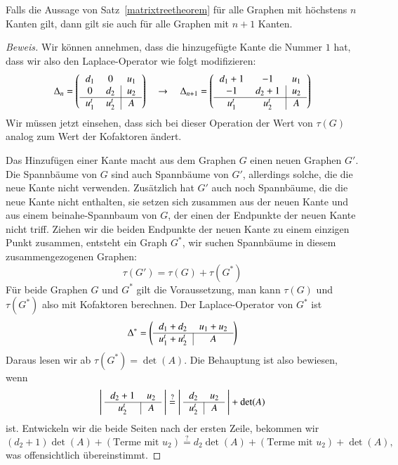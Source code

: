 \begin{hilfssatz}
\label{matrixtreetheoremstep}
Falls die Aussage von Satz~\ref{matrixtreetheorem}
für alle Graphen mit höchstens $n$ Kanten
gilt, dann gilt sie auch für alle Graphen mit $n+1$ Kanten.
\end{hilfssatz}

\begin{proof}[Beweis]
Wir können annehmen, dass die hinzugefügte Kante die Nummer $1$
hat, dass wir also den Laplace-Operator wie folgt modifizieren:
\[
\Delta_n
=
\left(\begin{tabular}{>{$}c<{$}>{$}c<{$}|>{$}c<{$}>{$}c<{$}}
d_1   &    0&u_1\\
    0 &d_2  &u_2\\
\hline
 u_1^t&u_2^t&A
\end{tabular}
\right)
\quad
\rightarrow
\quad
\Delta_{n+1}
=
\left(\begin{tabular}{>{$}c<{$}>{$}c<{$}|>{$}c<{$}>{$}c<{$}}
d_1+1 &   -1&u_1\\
   -1 &d_2+1&u_2\\
\hline
u_1^t &u_2^t&A
\end{tabular}
\right)
\]
Wir müssen jetzt einsehen, dass sich bei dieser Operation
der Wert von $\tau(G)$ analog zum Wert der Kofaktoren ändert.

Das Hinzufügen einer Kante macht aus dem Graphen $G$ einen neuen
Graphen $G'$. Die Spannbäume von $G$ sind auch Spannbäume von $G'$,
allerdings solche, die die neue Kante nicht verwenden. Zusätzlich
hat $G'$ auch noch Spannbäume, die die neue Kante nicht enthalten,
sie setzen sich zusammen aus der neuen Kante und aus einem beinahe-Spannbaum
von $G$, der einen der Endpunkte der neuen Kante nicht triff. 
Ziehen wir die beiden Endpunkte der neuen Kante zu einem einzigen
Punkt zusammen, entsteht ein Graph $G^*$, wir suchen Spannbäume in 
diesem zusammengezogenen Graphen:
\[
\tau(G')=\tau(G)+\tau(G^*)
\]
Für beide Graphen $G$ und $G^*$ gilt die Voraussetzung, man kann
$\tau(G)$ und $\tau(G^*)$ also mit Kofaktoren berechnen. Der Laplace-Operator
von $G^*$ ist
\[
\Delta^*
=
\left(\begin{tabular}{>{$}c<{$}|>{$}c<{$}>{$}c<{$}}
d_1+d_2&u_1+u_2\\
\hline
u_1^t +u_2^t&A
\end{tabular}
\right)
\]
Daraus lesen wir ab $\tau(G^*)=\det(A)$.
Die Behauptung ist also bewiesen, wenn
\[
\left|\;\begin{tabular}{>{$}c<{$}|>{$}c<{$}>{$}c<{$}}
d_2+1&u_2\\
\hline
u_2^t&A
\end{tabular}
\;
\right|
\overset{?}{=}
\left|\;\begin{tabular}{>{$}c<{$}|>{$}c<{$}>{$}c<{$}}
d_2  &u_2\\
\hline
u_2^t&A
\end{tabular}
\;
\right|
+\det(A)
\]
ist.
Entwickeln wir die beide Seiten nach der ersten Zeile, bekommen
wir 
\[
(d_2+1)\det(A)+(\text{Terme mit $u_2$})
\overset{?}{=}
d_2\det(A)+(\text{Terme mit $u_2$})+\det(A),
\]
was offensichtlich übereinstimmt.


\end{proof}
